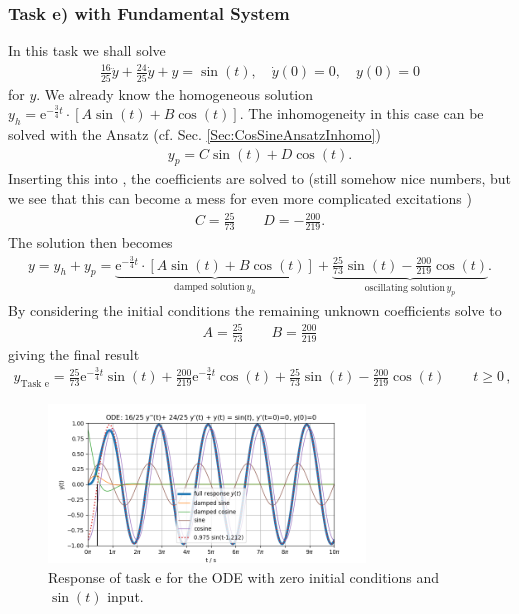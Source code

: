 \subsubsection{Task e) with Fundamental System}
In this task we shall solve
\begin{align}
\label{eq:InHomoODE_sin}
\frac{16}{25} \ddot{y} + \frac{24}{25} \dot{y} + y = \sin(t), \quad
\dot{y}(0) = 0,\quad y(0)=0
\end{align}
for $y$.
%
We already know the homogeneous solution
$y_h = \mathrm{e}^{-\frac{3}{4} t} \cdot
\left[ A \sin(t) + B \cos(t)\right]$.
%
The inhomogeneity in this case can be solved with the Ansatz (cf.
Sec. \ref{Sec:CosSineAnsatzInhomo})
\begin{align}
y_p = C \sin(t) + D \cos(t).
\end{align}
Inserting this into , the
coefficients are solved to (still somehow nice numbers, but we see that this can
become a mess for even more complicated excitations
)
\begin{align}
C = \frac{25}{73}\qquad D = -\frac{200}{219}.
\end{align}
%
The solution then becomes
\begin{align}
y = y_h + y_p = \underbrace{\mathrm{e}^{-\frac{3}{4} t} \cdot
\left[ A \sin(t) + B \cos(t)\right]}_{\text{damped solution} \, y_h}+
\underbrace{\frac{25}{73} \sin(t) - \frac{200}{219} \cos(t)}_{\text{oscillating solution} \, y_p}.
\end{align}
By considering the initial conditions the remaining unknown coefficients solve to
\begin{align}
A = \frac{25}{73}\qquad B = \frac{200}{219}
\end{align}
giving the final result
\begin{align}
\boxed{
y_\text{Task e} = \frac{25}{73} \mathrm{e}^{-\frac{3}{4} t} \sin(t) +
\frac{200}{219} \mathrm{e}^{-\frac{3}{4} t} \cos(t) +
\frac{25}{73} \sin(t) -
\frac{200}{219} \cos(t) \qquad t\geq 0
}\, ,
\end{align}
%
\begin{figure}[h!]
\centering
\includegraphics[width=0.75\textwidth]{../laplace_transform/sine_excitation_response}
\caption{Response of task e for the ODE with zero initial conditions and
$\sin(t)$ input.}
\label{fig:sine_excitation_response}
\end{figure}


